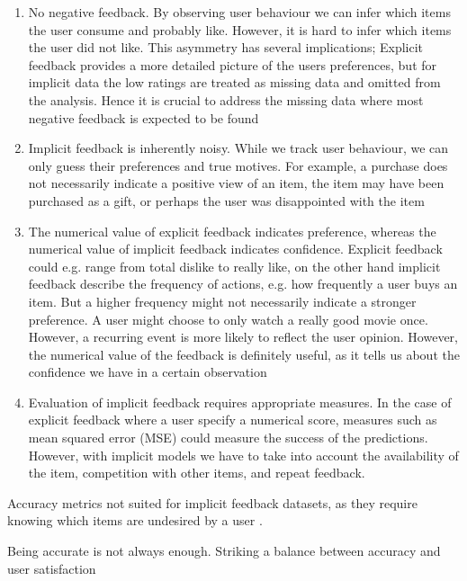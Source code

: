 \begin{enumerate}

\item No negative feedback. By observing user behaviour we can infer which items the user consume and probably like. However, it is hard to infer
which items the user did not like. This asymmetry has several implications; Explicit feedback provides a more detailed picture of the
users preferences, but for implicit data the low ratings are treated as missing data and omitted from the analysis. Hence it is crucial to address
the missing data where most negative feedback is expected to be found

\item Implicit feedback is inherently noisy. While we track user behaviour, we can only guess their preferences and true motives. For example, a
purchase does not necessarily indicate a positive view of an item, the item may have been purchased as a gift, or perhaps the user was disappointed
with the item

\item The numerical value of explicit feedback indicates preference, whereas the numerical value of implicit feedback indicates confidence. Explicit
feedback could e.g. range from total dislike to really like, on the other hand implicit feedback describe the frequency of actions, e.g. how
frequently a user buys an item. But a higher frequency might not necessarily indicate a stronger preference. A user might choose to only
watch a really good movie once. However, a recurring event is more likely to reflect the user opinion. However, the numerical value of the feedback
is definitely useful, as it tells us about the confidence we have in a certain observation

\item Evaluation of implicit feedback requires appropriate measures. In the case of explicit feedback where a user specify a numerical score, measures such
as mean squared error (MSE) could measure the success of the predictions. However, with implicit models we have to take into account
the availability of the item, competition with other items, and repeat
feedback.

\end{enumerate}

Accuracy metrics not suited for implicit feedback datasets, as they require knowing which items are undesired by a user \cite{Hu2008}.

Being accurate is not always enough. Striking a balance between accuracy and user satisfaction \cite{McNee2006}

